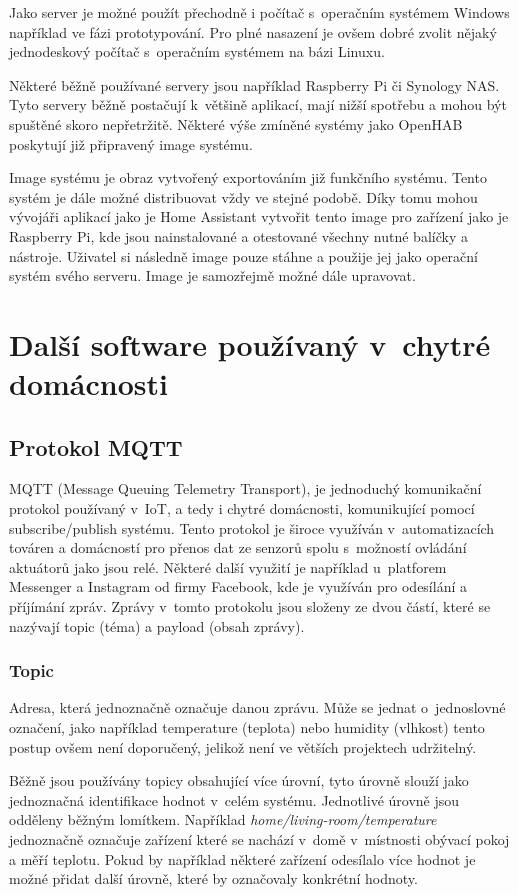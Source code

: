 Jako server je možné použít přechodně i počítač s~operačním systémem Windows například ve fázi prototypování. Pro plné nasazení je ovšem dobré zvolit nějaký jednodeskový počítač s~operačním systémem na bázi Linuxu. 

Některé běžně používané servery jsou například Raspberry Pi či Synology NAS. Tyto servery běžně postačují k~většině aplikací, mají nižší spotřebu a mohou být spuštěné skoro nepřetržitě. Některé výše zmíněné systémy jako OpenHAB poskytují již připravený image systému.

Image systému je obraz vytvořený exportováním již funkčního systému. Tento systém je dále možné distribuovat vždy ve stejné podobě. Díky tomu mohou vývojáři aplikací jako je Home Assistant vytvořit tento image pro zařízení jako je Raspberry Pi, kde jsou nainstalované a otestované všechny nutné balíčky a nástroje. Uživatel si následně image pouze stáhne a použije jej jako operační systém svého serveru. Image je samozřejmě možné dále upravovat.

\section{Další software používaný v~chytré domácnosti}

\subsection*{Protokol MQTT}
MQTT (Message Queuing Telemetry Transport), je jednoduchý komunikační protokol používaný v~IoT, a tedy i chytré domácnosti, komunikující pomocí subscribe/publish systému. Tento protokol je široce využíván v~automatizacích továren a domácností pro přenos dat ze senzorů spolu s~možností ovládání aktuátorů jako jsou relé. Některé další využití je například u~platforem Messenger a Instagram od firmy Facebook, kde je využíván pro odesílání a příjímání zpráv. Zprávy v~tomto protokolu jsou složeny ze dvou částí, které se nazývají topic (téma) a payload (obsah zprávy).

\subsubsection*{Topic}
Adresa, která jednoznačně označuje danou zprávu. Může se jednat o~jednoslovné označení, jako například temperature (teplota) nebo humidity (vlhkost) tento postup ovšem není doporučený, jelikož není ve větších projektech udržitelný.\cite{mqtt-best-practices}

Běžně jsou používány topicy obsahující více úrovní, tyto úrovně slouží jako jednoznačná identifikace hodnot v~celém systému. Jednotlivé úrovně jsou odděleny běžným lomítkem. Například \emph{home/living-room/temperature} jednoznačně označuje zařízení které se nachází v~domě v~místnosti obývací pokoj a měří teplotu. Pokud by například některé zařízení odesílalo více hodnot je možné přidat další úrovně, které by označovaly konkrétní hodnoty.

